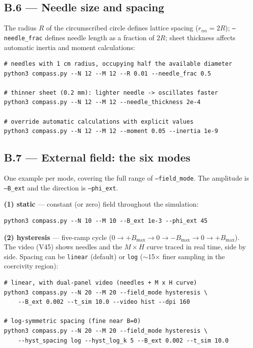 \documentclass[11pt,a4paper]{article}
\newcommand{\code}[1]{\texttt{#1}}
\begin{document}
\subsection*{B.6 --- Needle size and spacing}

The radius $R$ of the circumscribed circle defines lattice spacing ($r_{nn} = 2R$); \code{--needle\_frac} defines needle length as a fraction of $2R$; sheet thickness affects automatic inertia and moment calculations:
\begin{verbatim}
# needles with 1 cm radius, occupying half the available diameter
python3 compass.py --N 12 --M 12 --R 0.01 --needle_frac 0.5

# thinner sheet (0.2 mm): lighter needle -> oscillates faster
python3 compass.py --N 12 --M 12 --needle_thickness 2e-4

# override automatic calculations with explicit values
python3 compass.py --N 12 --M 12 --moment 0.05 --inertia 1e-9
\end{verbatim}

\subsection*{B.7 --- External field: the six modes}

One example per mode, covering the full range of \code{--field\_mode}. The amplitude is \code{--B\_ext} and the direction is \code{--phi\_ext}.

\medskip\noindent\textbf{(1) static} --- constant (or zero) field throughout the simulation:
\begin{verbatim}
python3 compass.py --N 10 --M 10 --B_ext 1e-3 --phi_ext 45
\end{verbatim}

\noindent\textbf{(2) hysteresis} --- five-ramp cycle ($0 \to +B_{\max} \to 0 \to -B_{\max} \to 0 \to +B_{\max}$). The video (V45) shows needles and the $M\times H$ curve traced in real time, side by side. Spacing can be \code{linear} (default) or \code{log} ($\sim$15$\times$ finer sampling in the coercivity region):
\begin{verbatim}
# linear, with dual-panel video (needles + M x H curve)
python3 compass.py --N 20 --M 20 --field_mode hysteresis \
    --B_ext 0.002 --t_sim 10.0 --video hist --dpi 160

# log-symmetric spacing (fine near B=0)
python3 compass.py --N 20 --M 20 --field_mode hysteresis \
    --hyst_spacing log --hyst_log_k 5 --B_ext 0.002 --t_sim 10.0
\end{verbatim}
\end{document}
